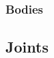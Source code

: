 %
%
%
%
%
%
\subsubsection{Bodies}
\label{sec:mbd-body}
%
%
%
%
%

\subsection{Joints}
\label{sec:mbd-joint}

